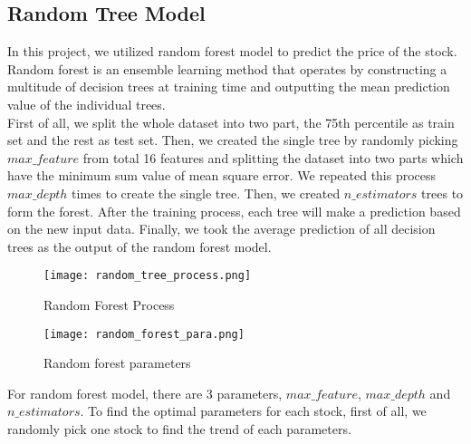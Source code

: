 \documentclass[fleqn,10pt]{SelfArx} %
\begin{document}
\subsection{Random Tree Model}
In this project, we utilized random forest model to predict the price of the stock. Random forest is an ensemble learning method that operates by constructing a multitude of decision trees at training time and outputting the mean prediction value of the individual trees.\cite{Breiman2001}\\
\newline
\noindent
First of all, we split the whole dataset into two part, the 75th percentile as train set and the rest as test set. Then, we created the single tree by randomly picking $max\_feature$ from total 16 features and splitting the dataset into two parts which have the minimum sum value of mean square error.  We repeated this process $max\_depth$ times to create the single tree. Then, we created $n\_estimators$ trees to form the forest. After the training process, each tree will make a prediction based on the new input data. Finally, we took the average prediction of all decision trees as the output of the random forest model.\\

\begin{figure}[ht]\centering
\texttt{[image: random\_tree\_process.png]}
\caption{Random Forest Process}
\label{fig:results}
\end{figure}

\begin{figure}[ht]\centering %
\texttt{[image: random\_forest\_para.png]}
\caption{Random forest parameters}
\label{fig:view}
\end{figure}

\noindent 
For random forest model, there are 3 parameters, $max\_feature$, $max\_depth$ and $n\_estimators$. To find the optimal parameters for each stock, first of all, we randomly pick one stock to find the trend of each parameters. \\
%
%
%
\end{document}
